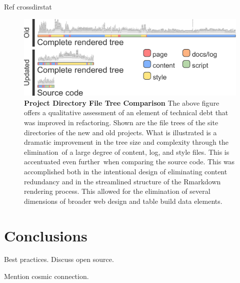 \documentclass[10pt]{report}
\begin{document}
Ref crossdirstat

\begin{figure}[H]
    \centering
    \includegraphics[width=\textwidth]{fig/file_tree.pdf}
    \caption[Project Directory File Tree Comparison]{\textbf{Project Directory File Tree Comparison} The above figure offers a qualitative assessment of an element of technical debt that was improved in refactoring. Shown are the file trees of the site directories of the new and old projects. What is illustrated is a dramatic improvement in the tree size and complexity through the elimination of a large degree of content, log, and style files. This is accentuated even further when comparing the source code. This was accomplished both in the intentional design of eliminating content redundancy and in the streamlined structure of the Rmarkdown rendering process. This allowed for the elimination of several dimensions of broader web design and table build data elements.}\label{fig:fileTree}
\end{figure}




\chapter{Conclusions}

Best practices. Discuss open source.

Mention cosmic connection.

\printbibliography{}
\end{document}
